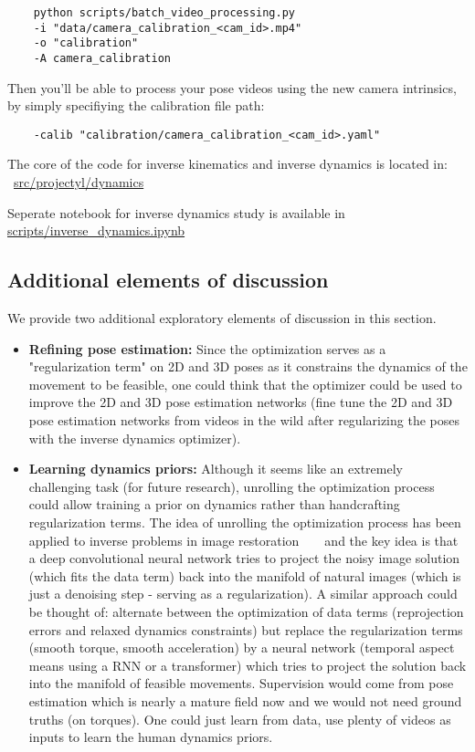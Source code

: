 \begin{verbatim}
    python scripts/batch_video_processing.py
    -i "data/camera_calibration_<cam_id>.mp4"
    -o "calibration"
    -A camera_calibration
\end{verbatim}

Then you'll be able to process your pose videos using the new camera intrinsics, by simply specifiying
the calibration file path:
\begin{verbatim}
    -calib "calibration/camera_calibration_<cam_id>.yaml"
\end{verbatim}

The core of the code for inverse kinematics and inverse dynamics is located in:
~\href{https://github.com/balthazarneveu/monocular_pose_and_forces_estimation/tree/main/src/projectyl/dynamics}{src/projectyl/dynamics}

Seperate notebook for inverse dynamics study is available in 
\href{https://github.com/balthazarneveu/monocular_pose_and_forces_estimation/blob/main/scripts/inverse_dynamics.ipynb}{scripts/inverse\_dynamics.ipynb}

\subsection{Additional elements of discussion}
\label{app:additional_discussion}
We provide two additional exploratory elements of discussion in this section.
\begin{itemize}
\item \textbf{Refining pose estimation: } Since the optimization serves as a "regularization term" on 2D and 3D poses as it constrains the dynamics of the movement to be feasible,
one could think that the optimizer could be used to improve the 2D and 3D pose estimation networks (fine tune the 2D and 3D pose estimation networks from videos in the wild
after regularizing the poses with the inverse dynamics optimizer).

\item \textbf{Learning dynamics priors:}  Although it seems like an extremely challenging task (for future research), unrolling the optimization process could allow 
training a prior on dynamics rather than handcrafting regularization terms. The idea of unrolling the optimization process has been applied
to inverse problems in image restoration ~\cite{lecouat2021lucaskanade} ~\cite{Venkatakrishnan20135292013PP} and
the key idea is that a deep convolutional neural network tries to project the noisy image solution (which fits the data term) back into the manifold of natural images (which is just a denoising step - serving as a regularization).
A similar approach could be thought of: alternate between the optimization of data terms (reprojection errors and relaxed dynamics constraints) 
but replace the regularization terms (smooth torque, smooth acceleration) by a neural network (temporal aspect means using a RNN or a transformer) which tries to project 
the solution back into the manifold of feasible movements. Supervision would come from pose estimation which is nearly a mature field now and we would not need ground truths (on torques).
One could just learn from data, use plenty of videos as inputs to learn the human dynamics priors.
\end{itemize}